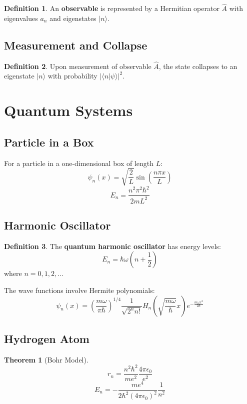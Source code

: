 \documentclass[11pt]{article}
\theoremstyle{definition}
\newtheorem{definition}{Definition}[section]
\newtheorem{theorem}{Theorem}[section]
\begin{document}
\begin{definition}
An \textbf{observable} is represented by a Hermitian operator $\hat{A}$ with eigenvalues $a_n$ and eigenstates $|n\rangle$.
\end{definition}

\subsection{Measurement and Collapse}
\begin{definition}
Upon measurement of observable $\hat{A}$, the state collapses to an eigenstate $|n\rangle$ with probability $|\langle n|\psi\rangle|^2$.
\end{definition}

\section{Quantum Systems}

\subsection{Particle in a Box}
For a particle in a one-dimensional box of length $L$:
$$\psi_n(x) = \sqrt{\frac{2}{L}} \sin\left(\frac{n\pi x}{L}\right)$$
$$E_n = \frac{n^2\pi^2\hbar^2}{2mL^2}$$

\subsection{Harmonic Oscillator}
\begin{definition}
The \textbf{quantum harmonic oscillator} has energy levels:
$$E_n = \hbar\omega\left(n + \frac{1}{2}\right)$$
where $n = 0, 1, 2, \ldots$
\end{definition}

The wave functions involve Hermite polynomials:
$$\psi_n(x) = \left(\frac{m\omega}{\pi\hbar}\right)^{1/4} \frac{1}{\sqrt{2^n n!}} H_n\left(\sqrt{\frac{m\omega}{\hbar}}x\right) e^{-\frac{m\omega x^2}{2\hbar}}$$

\subsection{Hydrogen Atom}
\begin{theorem}[Bohr Model]
$$r_n = \frac{n^2\hbar^2}{me^2} \frac{4\pi\epsilon_0}{e^2}$$
$$E_n = -\frac{me^4}{2\hbar^2(4\pi\epsilon_0)^2} \frac{1}{n^2}$$
\end{theorem}
\end{document}
